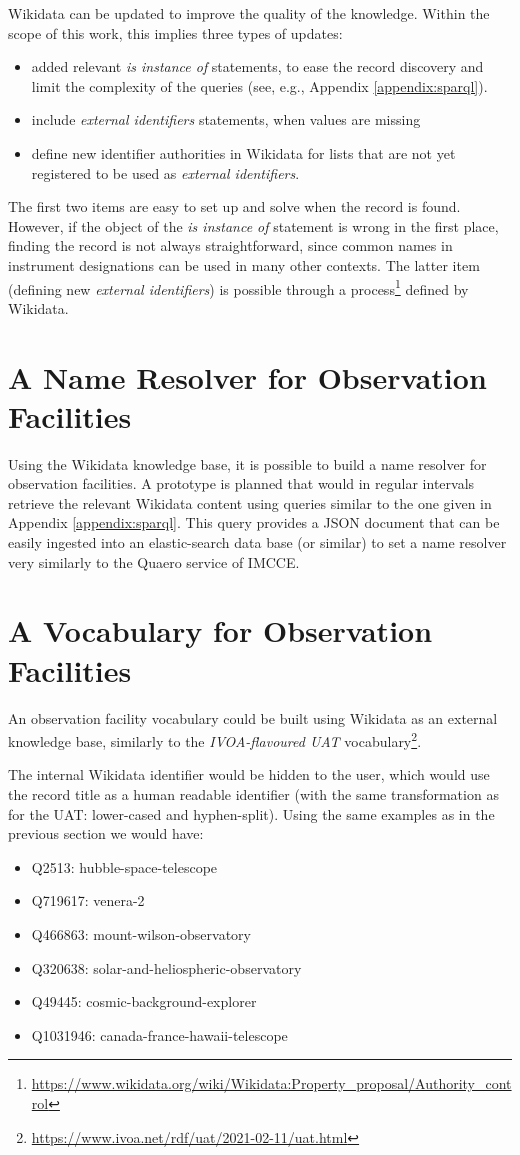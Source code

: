 \documentclass[11pt,a4paper]{ivoa}
\begin{document}
Wikidata can be updated to improve the quality of the knowledge.
Within the scope of this work, this implies three types of updates:
\begin{itemize}
\item added relevant \emph{is instance of} statements, to ease the 
record discovery and limit the complexity of the queries (see, e.g., 
Appendix \ref{appendix:sparql}). 
\item include \emph{external identifiers} statements, when values 
are missing
\item define new identifier authorities in Wikidata for lists that 
are not yet registered to be used as \emph{external identifiers}. 
\end{itemize}
The first two items are easy to set up and solve when the record is 
found. However, if the object of the \emph{is instance of} statement is 
wrong in the first place, finding the record is not always 
straightforward, since common names in instrument designations 
can be used in many other contexts. 
The latter item (defining new \emph{external identifiers}) is 
possible through a process\footnote{\url{https://www.wikidata.org/wiki/Wikidata:Property_proposal/Authority_control}}
defined by Wikidata. 

\section{A Name Resolver for Observation Facilities}
Using the Wikidata knowledge base, it is possible to build a name
resolver for observation facilities. A prototype is planned that would
in regular intervals retrieve the relevant 
Wikidata content using queries similar to the one
given in Appendix \ref{appendix:sparql}. This query provides
a JSON document that can be easily ingested into an elastic-search
data base (or similar) to set a name resolver very similarly to 
the Quaero service of IMCCE. 

\section{A Vocabulary for Observation Facilities}
An observation facility vocabulary could be built using Wikidata
as an external knowledge base, similarly to the \emph{IVOA-flavoured 
UAT} vocabulary\footnote{\url{https://www.ivoa.net/rdf/uat/2021-02-11/uat.html}}.

The internal Wikidata identifier would be hidden to the user, which 
would use the record title as a human readable identifier (with the 
same transformation as for the UAT: lower-cased and hyphen-split). 
Using the same examples as in the previous section we would have: 
\begin{itemize}
\item Q2513: hubble-space-telescope
\item Q719617: venera-2
\item Q466863: mount-wilson-observatory
\item Q320638: solar-and-heliospheric-observatory
\item Q49445: cosmic-background-explorer
\item Q1031946: canada-france-hawaii-telescope
\end{itemize}
\end{document}
